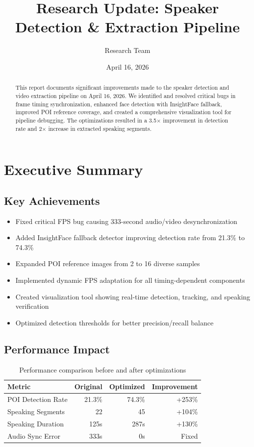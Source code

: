 \documentclass[11pt,a4paper]{article}
\title{\textbf{Research Update: Speaker Detection \& Extraction Pipeline}}
\author{Research Team}
\date{April 16, 2026}
\begin{document}
\maketitle

\begin{abstract}
This report documents significant improvements made to the speaker detection and video extraction pipeline on April 16, 2026. We identified and resolved critical bugs in frame timing synchronization, enhanced face detection with InsightFace fallback, improved POI reference coverage, and created a comprehensive visualization tool for pipeline debugging. The optimizations resulted in a 3.5$\times$ improvement in detection rate and 2$\times$ increase in extracted speaking segments.
\end{abstract}

\tableofcontents
\newpage

\section{Executive Summary}

\subsection{Key Achievements}

\begin{itemize}[label=\checkmark]
    \item Fixed critical FPS bug causing 333-second audio/video desynchronization
    \item Added InsightFace fallback detector improving detection rate from 21.3\% to 74.3\%
    \item Expanded POI reference images from 2 to 16 diverse samples
    \item Implemented dynamic FPS adaptation for all timing-dependent components
    \item Created visualization tool showing real-time detection, tracking, and speaking verification
    \item Optimized detection thresholds for better precision/recall balance
\end{itemize}

\subsection{Performance Impact}

\begin{table}[h]
\centering
\begin{tabular}{@{}lrrr@{}}
\toprule
\textbf{Metric} & \textbf{Original} & \textbf{Optimized} & \textbf{Improvement} \\
\midrule
POI Detection Rate & 21.3\% & 74.3\% & +253\% \\
Speaking Segments & 22 & 45 & +104\% \\
Speaking Duration & 125s & 287s & +130\% \\
Audio Sync Error & 333s & 0s & Fixed \\
\bottomrule
\end{tabular}
\caption{Performance comparison before and after optimizations}
\label{tab:performance}
\end{table}
\end{document}
